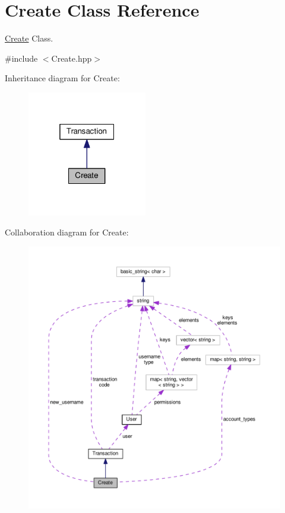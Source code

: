 \hypertarget{class_create}{\section{Create Class Reference}
\label{class_create}
}


\hyperlink{class_create}{Create} Class.  




{\ttfamily \#include $<$Create.\-hpp$>$}



Inheritance diagram for Create\-:
\nopagebreak
\begin{figure}[H]
\begin{center}
\leavevmode
\includegraphics[width=148pt]{class_create__inherit__graph}
\end{center}
\end{figure}


Collaboration diagram for Create\-:
\nopagebreak
\begin{figure}[H]
\begin{center}
\leavevmode
\includegraphics[width=350pt]{class_create__coll__graph}
\end{center}
\end{figure}
